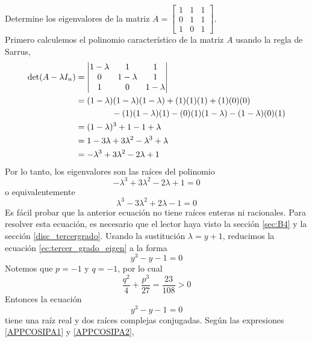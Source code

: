 \begin{example}
    Determine los eigenvalores de la matriz $A = \begin{bmatrix}
        1 & 1 & 1 \\
        0 & 1 & 1 \\
        1 & 0 & 1
    \end{bmatrix}$. \\
    \solucion Primero calculemos el polinomio característico de la matriz $A$ usando la regla de Sarrus,
    \begin{align*}
        \operatorname{det}(A - \lambda I_n) & = \begin{vmatrix}
            1 - \lambda & 1 & 1 \\
            0 & 1 - \lambda & 1 \\
            1 & 0 & 1 - \lambda
        \end{vmatrix} \\
        & = (1 - \lambda)(1 - \lambda)(1 - \lambda) + (1)(1)(1) + (1)(0)(0) \\
        & \hspace{1.5cm} - (1)(1 - \lambda)(1) - (0)(1)(1 - \lambda) - (1 - \lambda)(0)(1) \\
        & = (1 - \lambda)^3 + 1 - 1 + \lambda \\
        & = 1 - 3\lambda + 3\lambda^2 - \lambda^3 + \lambda \\
        & = - \lambda^3 + 3 \lambda^2 - 2\lambda + 1
    \end{align*}\newpage\noindent
    Por lo tanto, los eigenvalores son las raíces del polinomio
    $$- \lambda^3 + 3 \lambda^2 - 2\lambda + 1 = 0$$
    o equivalentemente
    \begin{equation}
        \lambda^3 - 3 \lambda^2 + 2\lambda - 1 = 0 \label{ec:tercer_grado_eigen}
    \end{equation}
    Es fácil probar que la anterior ecuación no tiene raíces enteras ni racionales. Para resolver esta ecuación, es necesario que el lector haya visto la sección \ref{sec:B4} y la sección \ref{disc_tercergrado}. Usando la sustitución $\lambda = y + 1$, reducimos la ecuación \eqref{ec:tercer_grado_eigen} a la forma
    \begin{equation}
        y^3 - y - 1 = 0 \label{ec:tercer_grado_eigen2}
    \end{equation}
    Notemos que $p = -1$ y $q = -1$, por lo cual
    $$\frac{q^2}{4} + \frac{p^3}{27} = \frac{23}{108} > 0$$
    Entonces la ecuación
    $$y^3 - y - 1 = 0$$
    tiene una raíz real y dos raíces complejas conjugadas. Según las expresiones \eqref{APPCOSIPA1} y \eqref{APPCOSIPA2},

\end{example}
